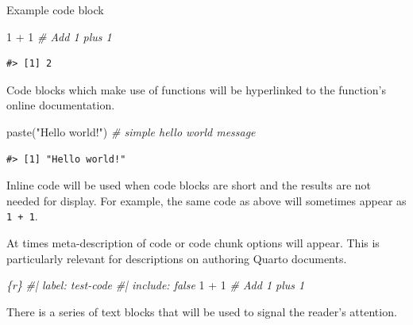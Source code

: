 \documentclass[
  letterpaper,
]{scrbook}
\newenvironment{Shaded}{\begin{snugshade}}{\end{snugshade}}
\newcommand{\CommentTok}[1]{\textcolor[rgb]{0.00,0.00,0.00}{\textit{#1}}}
\newcommand{\DecValTok}[1]{\textcolor[rgb]{0.00,0.00,0.00}{#1}}
\newcommand{\FunctionTok}[1]{\textcolor[rgb]{0.00,0.00,0.00}{#1}}
\newcommand{\InformationTok}[1]{\textcolor[rgb]{0.00,0.00,0.00}{\textit{#1}}}
\newcommand{\NormalTok}[1]{\textcolor[rgb]{0.00,0.00,0.00}{#1}}
\newcommand{\SpecialCharTok}[1]{\textcolor[rgb]{0.00,0.00,0.00}{#1}}
\newcommand{\StringTok}[1]{\textcolor[rgb]{0.00,0.00,0.00}{#1}}
\begin{document}
\begin{codelisting}

\caption{Example code block}

\hypertarget{lst-code-block}{%
\label{lst-code-block}}%
\begin{Shaded}
\begin{Highlighting}[]
\DecValTok{1} \SpecialCharTok{+} \DecValTok{1} \CommentTok{\# Add 1 plus 1}
\end{Highlighting}
\end{Shaded}

\end{codelisting}

\begin{verbatim}
#> [1] 2
\end{verbatim}

Code blocks which make use of functions will be hyperlinked to the
function's online documentation.

\begin{Shaded}
\begin{Highlighting}[]
\FunctionTok{paste}\NormalTok{(}\StringTok{"Hello world!"}\NormalTok{) }\CommentTok{\# simple \textquotesingle{}hello world\textquotesingle{} message}
\end{Highlighting}
\end{Shaded}

\begin{verbatim}
#> [1] "Hello world!"
\end{verbatim}

Inline code will be used when code blocks are short and the results are
not needed for display. For example, the same code as above will
sometimes appear as \texttt{1\ +\ 1}.

At times meta-description of code or code chunk options will appear.
This is particularly relevant for descriptions on authoring Quarto
documents.

\begin{Shaded}
\begin{Highlighting}[]
\InformationTok{\textasciigrave{}\textasciigrave{}\textasciigrave{}\{r\}}
\CommentTok{\#| label: test{-}code }
\CommentTok{\#| include: false}
\DecValTok{1} \SpecialCharTok{+} \DecValTok{1} \CommentTok{\# Add 1 plus 1}
\InformationTok{\textasciigrave{}\textasciigrave{}\textasciigrave{}}
\end{Highlighting}
\end{Shaded}

There is a series of text blocks that will be used to signal the
reader's attention.
\end{document}
